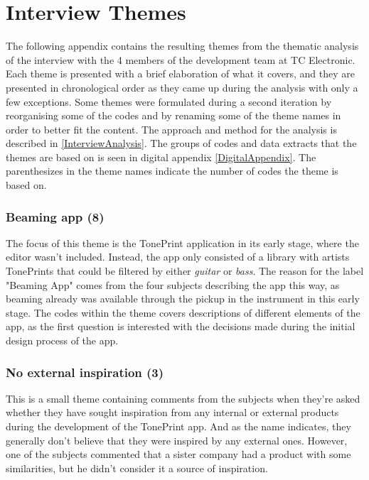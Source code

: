 \chapter{Interview Themes}
\label{App:Themes}
The following appendix contains the resulting themes from the thematic analysis of the interview with the 4 members of the development team at TC Electronic. Each theme is presented with a brief elaboration of what it covers, and they are presented in chronological order as they came up during the analysis with only a few exceptions. Some themes were formulated during a second iteration by reorganising some of the codes and by renaming some of the theme names in order to better fit the content. The approach and method for the analysis is described in \autoref{InterviewAnalysis}. The groups of codes and data extracts that the themes are based on is seen in digital appendix \autoref{DigitalAppendix}. The parenthesizes in the theme names indicate the number of codes the theme is based on.

\subsection*{Beaming app (8)}
\label{App:ThemeBeamingApp}
The focus of this theme is the TonePrint application in its early stage, where the editor wasn't included. Instead, the app only consisted of a library with artists TonePrints that could be filtered by either \textit{guitar} or \textit{bass}. The reason for the label "Beaming App" comes from the four subjects describing the app this way, as beaming already was available through the pickup in the instrument in this early stage. The codes within the theme covers descriptions of different elements of the app, as the first question is interested with the decisions made during the initial design process of the app.

\subsection*{No external inspiration (3)}
\label{App:ThemeNoExternalInspiration}
This is a small theme containing comments from the subjects when they're asked whether they have sought inspiration from any internal or external products during the development of the TonePrint app. And as the name indicates, they generally don't believe that they were inspired by any external ones. However, one of the subjects commented that a sister company had a product with some similarities, but he didn't consider it a source of inspiration.

